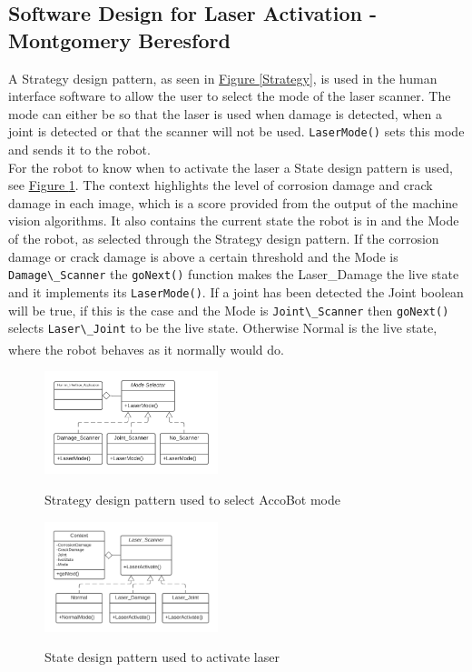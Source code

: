 \documentclass[11pt]{article}		%
\newcommand{\supercite}[1]{\textsuperscript{\cite{#1}}}		%
\newcommand{\figref}[1]{\hyperref[#1]{Figure \ref*{#1}}}    %
\begin{document}
	        
	        \subsection[Software Design for Laser Activation]{Software Design for Laser Activation - Montgomery Beresford}
	        
	        A Strategy design pattern, as seen in \figref{Strategy}, is used in the human interface software to allow the user to select the mode of the laser scanner. The mode can either be so that the laser is used when damage is detected, when a joint is detected or that the scanner will not be used. \verb|LaserMode()| sets this mode and sends it to the robot.	        \\ \hspace*{3ex}
	        For the robot to know when to activate the laser a State design pattern is used, see \figref{State}. The context highlights the level of corrosion damage and crack damage in each image, which is a score provided from the output of the machine vision algorithms. It also contains the current state the robot is in and the Mode of the robot, as selected through the Strategy design pattern. If the corrosion damage or crack damage is above a certain threshold and the Mode is  \verb|Damage\_Scanner| the \verb|goNext()| function makes the Laser\_Damage the live state and it implements its \verb|LaserMode()|. If a joint has been detected the Joint boolean will be true, if this is the case and the Mode is \verb|Joint\_Scanner| then \verb|goNext()| selects \verb|Laser\_Joint| to be the live state. Otherwise Normal is the live state, where the robot behaves as it normally would do. \supercite{Design_Patterns}
	        
	        	\begin{figure}[h]
				\centering
					\begin{multicols}{2}
					\includegraphics[width=0.45\textwidth]{Strategy_3YP_UML}
					\caption{Strategy design pattern used to select AccoBot mode}
					\label{Strategy}
			    	\columnbreak
					\includegraphics[width=0.45\textwidth]{State}
					\caption{State design pattern used to activate laser}
					\label{State}
					\end{multicols}
			\end{figure}	
			
\end{document}
